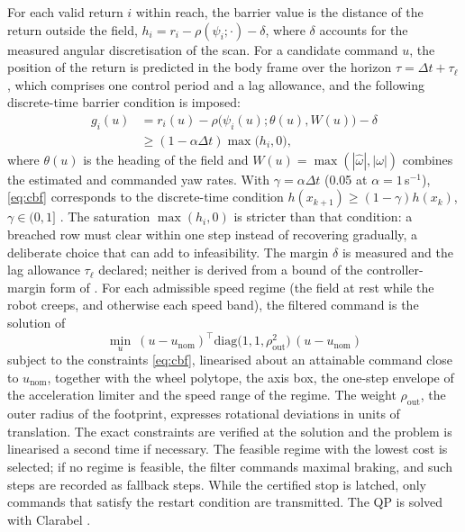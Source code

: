 \documentclass[conference]{IEEEtran}
\begin{document}
For each valid return $i$ within reach, the barrier value is the distance of the return outside the
field, $h_i=r_i-\rho(\psi_i;\cdot)-\delta$, where $\delta$ accounts for the measured angular
discretisation of the scan. For a candidate command $u$, the position of the return is predicted in the
body frame over the horizon $\tau=\Delta t+\tau_\ell$, which comprises one control period and a lag
allowance, and the following discrete-time barrier condition is imposed:
\begin{equation}
\begin{aligned}
g_i(u)&=r_i(u)-\rho\big(\psi_i(u);\theta(u),W(u)\big)-\delta\\
&\ge(1-\alpha\Delta t)\max\big(h_i,0\big),
\end{aligned}
\label{eq:cbf}
\end{equation}
where $\theta(u)$ is the heading of the field and $W(u)=\max(|\hat\omega|,|\omega|)$ combines the
estimated and commanded yaw rates. With $\gamma=\alpha\Delta t$ (0.05 at $\alpha=1$\,s$^{-1}$), \eqref{eq:cbf} corresponds to the discrete-time
condition $h(x_{k+1})\ge(1-\gamma)h(x_k)$, $\gamma\in(0,1]$ \cite{agrawal2017discrete,garg2024advances}. The
saturation $\max(h_i,0)$ is stricter than that condition: a breached row must clear within one step instead of
recovering gradually, a deliberate choice that can add to infeasibility. The margin $\delta$ is measured and the lag allowance $\tau_\ell$ declared; neither is derived from a bound of the
controller-margin form of \cite{garg2024advances}. For each admissible speed regime (the field at rest while the robot
creeps, and otherwise each speed band), the filtered command is the solution of
\begin{equation}
\min_u\ (u-u_{\mathrm{nom}})^\top \mathrm{diag}\big(1,1,\rho_{\mathrm{out}}^2\big)\,(u-u_{\mathrm{nom}})
\label{eq:qp}
\end{equation}
subject to the constraints \eqref{eq:cbf}, linearised about an attainable command close to
$u_{\mathrm{nom}}$, together with the wheel polytope, the axis box, the one-step envelope of the
acceleration limiter and the speed range of the regime. The weight $\rho_{\mathrm{out}}$, the outer
radius of the footprint, expresses rotational deviations in units of translation. The exact constraints
are verified at the solution and the problem is linearised a second time if necessary. The feasible
regime with the lowest cost is selected; if no regime is feasible, the filter commands maximal braking,
and such steps are recorded as fallback steps. While the certified stop is latched, only commands that
satisfy the restart condition are transmitted. The QP is solved with Clarabel \cite{goulart2024clarabel}.
\end{document}
